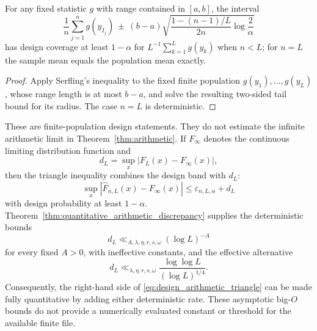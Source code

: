 \documentclass[11pt]{amsart}
\numberwithin{equation}{section}\setcounter{tocdepth}{3}\setcounter{secnumdepth}{3}
\begin{document}
\begin{corollary}
\label{cor:serfling_mean_interval}
For any fixed statistic $g$ with range contained in $[a,b]$, the interval
\begin{equation}
 \frac1n\sum_{j=1}^ng(y_{I_j})
 \ \pm\ (b-a)
 \sqrt{\frac{1-(n-1)/L}{2n}\log\frac2\alpha}
 \label{eq:serfling_mean_interval}
\end{equation}
has design coverage at least $1-\alpha$ for
$L^{-1}\sum_{k=1}^L g(y_k)$ when $n<L$; for $n=L$ the sample mean equals the population
mean exactly.
\end{corollary}
\begin{proof}
Apply Serfling's inequality to the fixed finite population
$g(y_1),\ldots,g(y_L)$, whose range length is at most $b-a$, and solve the resulting
two-sided tail bound for its radius.  The case $n=L$ is deterministic.
\end{proof}

These are finite-population design statements.  They do not estimate the infinite
arithmetic limit in Theorem~\ref{thm:arithmetic}.  If $F_\infty$ denotes the continuous
limiting distribution function and
\begin{equation}
 d_L=\sup_x|F_L(x)-F_\infty(x)|,
 \label{eq:arithmetic_deterministic_discrepancy}
\end{equation}
then the triangle inequality combines the design band with $d_L$:
\begin{equation}
 \sup_x|\widehat F_{n,L}(x)-F_\infty(x)|
 \le\varepsilon_{n,L,\alpha}+d_L
 \label{eq:design_arithmetic_triangle}
\end{equation}
with design probability at least $1-\alpha$.  Theorem~\ref{thm:quantitative_arithmetic_discrepancy}
supplies the deterministic bounds
\begin{equation}
 d_L\ll_{A,\lambda,\eta,r,s,\omega}(\log L)^{-A}
 \label{eq:finite_population_arithmetic_strong_rate}
\end{equation}
for every fixed $A>0$, with ineffective constants, and the effective alternative
\begin{equation}
 d_L\ll_{\lambda,\eta,r,s,\omega}
 \frac{\log\log L}{(\log L)^{1/4}}.
 \label{eq:finite_population_arithmetic_effective_rate}
\end{equation}
Consequently, the right-hand side of \eqref{eq:design_arithmetic_triangle} can be made
fully quantitative by adding either deterministic rate.  These asymptotic big-$O$
bounds do not provide a numerically evaluated constant or threshold for the available
finite file.
\end{document}
